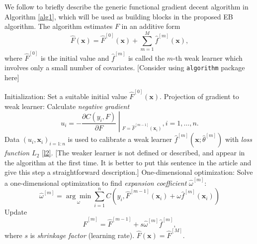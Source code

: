 \documentclass[11pt]{article}
\numberwithin{equation}{section}
\def\bx{\boldsymbol{x}}
\begin{document}
We follow \citet{buehlmann:2003} to briefly describe the generic functional gradient decent algorithm in Algorithm \ref{alg1}, which will be used as building blocks in the proposed EB algorithm. 
The algorithm estimates $F$ in an additive form
$$\hat{F}(\bx)=\hat{F}^{[0]}(\bx)+\sum_{m=1}^M\hat{f}^{[m]}(\bx),$$
where $\hat{F}^{[0]}$ is the initial value and $\hat{f}^{[m]}$ is called the $m$-th weak learner which involves only a small number of covariates.
{\color{blue}[Consider using {\tt algorithm} package here]}
\begin{algorithm} %
	\caption{The generic functional gradient decent algorithm.} %
	\label{alg1} %
	\begin{algorithmic}[1] %
		\STATE Initialization: Set a suitable initial value $\hat{F}^{[0]}(\bx).$  
		\STATE Projection of gradient to weak learner:
		Calculate \textit{negative gradient} $$u_i=\left.-\frac{\partial C(y_i,F)}{\partial F}\middle|_{F=\hat{F}^{[m-1]}(\bx_i)}\right., i=1,\ldots,n.$$
		Data $(u_i,\bx_i)_{i=1:n}$ is used to calibrate a weak learner $\hat{f}^{[m]}(\bx;\hat{\theta}^{[m]})$ with \textit{loss function $L_2$} \eqref{l2}.{\color{blue} [The weaker learner is not defined or described, and appear in the algorithm at the first time. It is better to put this sentence in the article and give this step a straightforward description.]}
		\STATE One-dimensional optimization:
		Solve a one-dimensional optimization  to find \textit{expansion coefficient} $\hat{\omega}^{[m]}$:
		$$\hat{\omega}^{[m]}=\underset{\omega}{\arg\min}\sum_{i=1}^n C(y_i, \hat{F}^{[m-1]}(\bx_i)+\omega\hat{f}^{[m]}(\bx_i))$$
		Update $$\hat{F}^{[m]}=\hat{F}^{[m-1]}+s\hat{\omega}^{[m]}\hat{f}^{[m]},$$
		where $s$ is \textit{shrinkage factor} (learning rate).
		\ENDFOR
		\RETURN $\hat{F}(\bx)=\hat{F}^{[M]}$.
	\end{algorithmic}
\end{algorithm}
\end{document}
